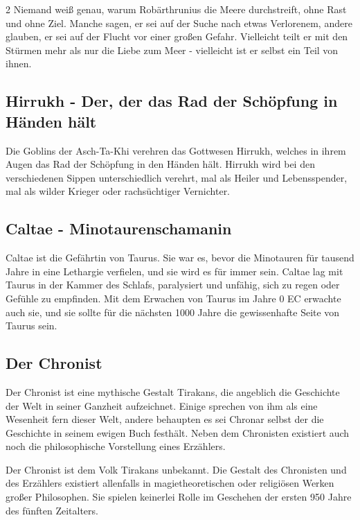 \begin{multicols*}{2}
Niemand weiß genau, warum Robärthrunius die Meere durchstreift, ohne Rast und ohne Ziel.
Manche sagen, er sei auf der Suche nach etwas Verlorenem, andere glauben, er sei auf der Flucht vor einer großen Gefahr.
Vielleicht teilt er mit den Stürmen mehr als nur die Liebe zum Meer - vielleicht ist er selbst ein Teil von ihnen.

\subsection{Hirrukh - Der, der das Rad der Schöpfung in Händen hält}\label{subsec:hirrukh-der-der-das-rad-der-schopfung-in-handen-halt}

Die Goblins der Asch-Ta-Khi verehren das Gottwesen Hirrukh, welches in ihrem Augen das Rad der Schöpfung in den Händen hält.
Hirrukh wird bei den verschiedenen Sippen unterschiedlich verehrt, mal als Heiler und Lebensspender, mal als wilder Krieger oder rachsüchtiger Vernichter.

\subsection{Caltae - Minotaurenschamanin}\label{subsec:caltae-minotaurenschamanin}

Caltae ist die Gefährtin von Taurus.
Sie war es, bevor die Minotauren für tausend Jahre in eine Lethargie verfielen, und sie wird es für immer sein.
Caltae lag mit Taurus in der Kammer des Schlafs, paralysiert und unfähig, sich zu regen oder Gefühle zu empfinden.
Mit dem Erwachen von Taurus im Jahre 0 EC erwachte auch sie, und sie sollte für die nächsten 1000 Jahre die gewissenhafte Seite von Taurus sein.

\subsection{Der Chronist}\label{subsec:der-chronist}

Der Chronist ist eine mythische Gestalt Tirakans, die angeblich die Geschichte der Welt in seiner Ganzheit aufzeichnet.
Einige sprechen von ihm als eine Wesenheit fern dieser Welt, andere behaupten es sei Chronar selbst der die Geschichte in seinem ewigen Buch festhält.
Neben dem Chronisten existiert auch noch die philosophische Vorstellung eines Erzählers.

Der Chronist ist dem Volk Tirakans unbekannt.
Die Gestalt des Chronisten und des Erzählers existiert allenfalls in magietheoretischen oder religiösen Werken großer Philosophen.
Sie spielen keinerlei Rolle im Geschehen der ersten 950 Jahre des fünften Zeitalters.


\end{multicols*}
